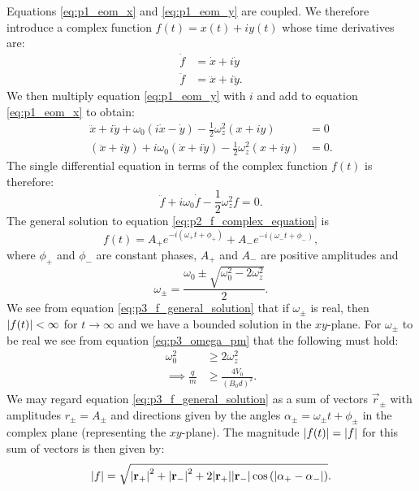 Equations \eqref{eq:p1_eom_x} and \eqref{eq:p1_eom_y} are coupled. We therefore introduce a complex function $f(t)=x(t)+i y(t)$ whose time derivatives are:
\begin{align}
    \dot{f} &= \dot{x}+i\dot{y} \\
    \ddot{f} &= \ddot{x} + i\ddot{y}.
\end{align}
We then multiply equation \eqref{eq:p1_eom_y} with $i$ and add to equation \eqref{eq:p1_eom_x} to obtain:
\begin{align}
    \ddot{x} + i\ddot{y} + \omega_0(i\dot{x} - \dot{y}) -\frac{1}{2}\omega_z^2(x+iy) &= 0 \nonumber \\
    (\ddot{x} + i\ddot{y}) + i\omega_0(\dot{x} +i \dot{y}) -\frac{1}{2}\omega_z^2(x+iy) &= 0. \label{eq:p2_eom_rewritten}
\end{align}
The single differential equation in terms of the complex function $f(t)$ is therefore: 
\begin{equation}
    \ddot{f} + i\omega_0 \dot{f} - \frac{1}{2}\omega_z^2 f = 0. \label{eq:p2_f_complex_equation}
\end{equation}
The general solution to equation \eqref{eq:p2_f_complex_equation} is 
\begin{equation}
    f(t) = A_+ e^{-i(\omega_+ t + \phi_+)} + A_- e^{-i(\omega_- t + \phi_-)}, \label{eq:p3_f_general_solution}
\end{equation}
where $\phi_+$ and $\phi_-$ are constant phases, $A_+$ and $A_-$ are positive amplitudes and 
\begin{equation}
    \omega_\pm = \frac{\omega_0 \pm \sqrt{\omega_0^2 - 2\omega_z^2}}{2}. \label{eq:p3_omega_pm}
\end{equation}
We see from equation  \eqref{eq:p3_f_general_solution} that if $\omega_\pm$ is real, then $\abs{f(t)} < \infty$ for $t\to\infty$ and we have a bounded solution in the $xy$-plane. For $\omega_\pm$ to be real we see from equation \eqref{eq:p3_omega_pm} that the following must hold:
\begin{align}
    \omega_0^2 &\geq 2\omega_z^2  \\
    \implies \frac{q}{m} &\geq \frac{4V_0}{(B_0d)^2}.
\end{align} 
We may regard equation \eqref{eq:p3_f_general_solution} as a sum of vectors $\vec{r}_\pm$ with amplitudes $r_\pm=A_\pm$ and directions given by the angles $\alpha_\pm = \omega_\pm t + \phi_\pm$ in the complex plane (representing the $xy$-plane). The magnitude $\abs{f(t)} = \abs{f}$ for this sum of vectors is then given by:
\begin{align}
    \abs{f} = \sqrt{\abs{\mathbf{r}_+}^2 + \abs{\mathbf{r}_-}^2 + 2\abs{\mathbf{r}_+}\abs{\mathbf{r_-}}\cos{(\abs{\alpha_+-\alpha_-})}}.
\end{align}








